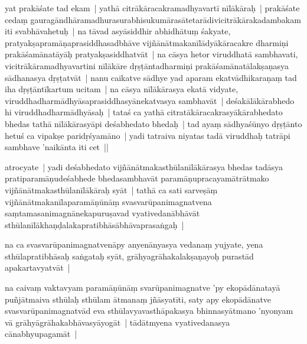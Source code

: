 \documentclass[article,12pt,a4paper]{memoir}%
\newcounter{parCount}
\begin{document}
	  
	  \pstart \leavevmode%
	\label{thakur75-129.22}yat prakāśate tad ekam | yathā citrākāracakramadhyavartī nīlākāraḥ | prakāśate cedaṃ gauragāndhāramadhurasurabhisukumārasātetarādivicitrākārakadambakam iti svabhāvahetuḥ | \label{thakur75-129.25} na tāvad asyāsiddhir abhidhātuṃ śakyate, pratyakṣapramāṇaprasiddhasadbhāve vijñānātmakanīlādyākāracakre dharmiṇi prakāśamānatāyāḥ pratyakṣasiddhatvāt | na cāsya \leavevmode{}\label{thakur75-130} hetor viruddhatā sambhavati, vicitrākāramadhyavartini nīlākāre dṛṣṭāntadharmiṇi prakāśamānatālakṣaṇasya sādhanasya dṛṣṭatvāt | nanu caikatve sādhye yad aparam ekatvādhikaraṇaṃ tad iha dṛṣṭāntīkartum ucitam | na cāsya nīlākārasya ekatā vidyate, viruddhadharmādhyāsaprasiddhasyānekatvasya sambhavāt | deśakālākārabhedo hi viruddhadharmādhyāsaḥ | tataś ca yathā citratākāracakrasyākārabhedato bhedas tathā nīlākārasyāpi deśabhedato bhedaḥ | tad ayaṃ sādhyaśūnyo dṛṣṭānto hetuś ca vipakṣe paridṛśyamāno | yadi tatraiva niyatas tadā viruddhaḥ \label{thakur75-130.8} tatrāpi sambhave 'naikānta iti cet ||
	{}
	\pend%
      

	  
	  \pstart \leavevmode%
	atrocyate | yadi deśabhedato vijñānātmakasthūlanīlākārasya bhedas tadāsya pratiparamāṇudeśabhede bhedasambhavāt paramāṇupracayamātrātmako vijñānātmakasthūlanīlākāraḥ syāt | tathā ca sati sarveṣāṃ vijñānātmakanīlaparamāṇūnāṃ svasvarūpanimagnatvena saṃtamasanimagnānekapuruṣavad vyativedanābhāvāt sthūlanīlākhaṇḍalakapratibhāsābhāvaprasaṅgaḥ |
	{}
	\pend%
      

	  
	  \pstart \leavevmode%
	na ca svasvarūpanimagnatvenāpy anyenānyasya vedanaṃ yujyate, yena sthūlapratibhāsaḥ saṅgataḥ syāt, grāhyagrāhakalakṣaṇayoḥ purastād apakartavyatvāt |
	{}
	\pend%
      

	  
	  \pstart \leavevmode%
	na caivaṃ vaktavyam paramāṇūnāṃ svarūpanimagnatve 'py ekopādānatayā puñjātmaiva sthūlaḥ sthūlam ātmanaṃ jñāsyatīti, saty apy ekopādānatve svasvarūpanimagnatvād eva sthūlavyavasthāpakasya bhinnasyātmano 'nyonyam vā grāhyāgrāhakabhāvasyāyogāt | tādātmyena vyativedanasya cānabhyupagamāt |
	{}
	\pend%
      
\end{document}
